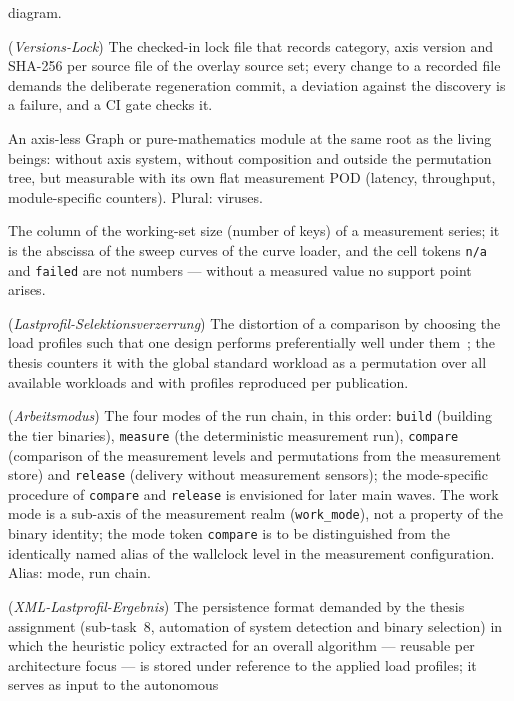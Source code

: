 \begin{description}
  diagram.
  \item[Version lock] (\emph{Versions-Lock}) The checked-in lock file that records category, axis
  version and SHA-256 per source file of the overlay source set; every change to a recorded file
  demands the deliberate regeneration commit, a deviation against the discovery is a failure, and
  a CI gate checks it.
  \item[Virus] An axis-less Graph or pure-mathematics module at the same root as the living beings:
  without axis system, without composition and outside the permutation tree, but measurable with
  its own flat measurement POD (latency, throughput, module-specific counters). Plural: viruses.
  \item[working\_set\_n] The column of the working-set size (number of keys) of a measurement
  series; it is the abscissa of the sweep curves of the curve loader, and the cell tokens
  \texttt{n/a} and \texttt{failed} are not numbers --- without a measured value no support point
  arises.
  \item[Workload selection bias] (\emph{Lastprofil-Selektionsverzerrung}) The distortion of a
  comparison by choosing the load profiles such that one design performs preferentially well under
  them~\cite{blackburn2016truth}; the thesis counters it with the global standard workload as a
  permutation over all available workloads and with profiles reproduced per publication.
  \item[Work mode] (\emph{Arbeitsmodus}) The four modes of the run chain, in this order:
  \texttt{build} (building the tier binaries), \texttt{measure} (the deterministic measurement
  run), \texttt{compare} (comparison of the measurement levels and permutations from the
  measurement store) and \texttt{release} (delivery without measurement sensors); the mode-specific procedure of
  \texttt{compare} and \texttt{release} is envisioned for later main waves. The work mode is
  a sub-axis of the measurement realm (\texttt{work\_mode}), not a property of the binary
  identity; the mode token \texttt{compare} is to be distinguished from the identically named
  alias of the wallclock level in the measurement configuration. Alias: mode, run chain.
  \item[XML load-profile result] (\emph{XML-Lastprofil-Ergebnis}) The persistence format demanded
  by the thesis assignment (sub-task~8, automation of system detection and binary selection) in
  which the heuristic policy extracted for an overall algorithm --- reusable per architecture focus
  --- is stored under reference to the applied load profiles; it serves as input to the autonomous

\end{description}
